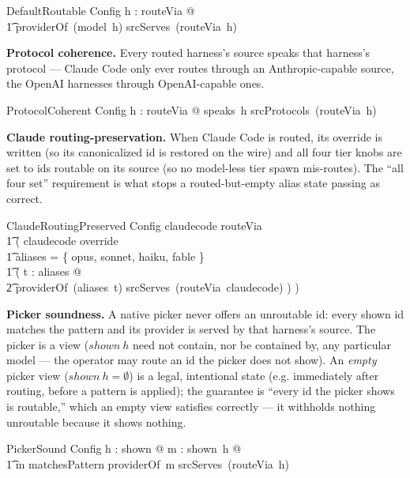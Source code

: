 \documentclass{article}
\begin{document}
\begin{schema}{DefaultRoutable}
	Config
	\where
	\forall h : \dom routeVia @ \\
	\t1 providerOf~(model~h) \in srcServes~(routeVia~h)
\end{schema}

\textbf{Protocol coherence.} Every routed harness's source speaks that harness's
protocol --- Claude Code only ever routes through an Anthropic-capable source,
the OpenAI harnesses through OpenAI-capable ones.

\begin{schema}{ProtocolCoherent}
	Config
	\where
	\forall h : \dom routeVia @ speaks~h \in srcProtocols~(routeVia~h)
\end{schema}

\textbf{Claude routing-preservation.} When Claude Code is routed, its override is
written (so its canonicalized id is restored on the wire) and all four tier
knobs are set to ids routable on its source (so no model-less tier spawn
mis-routes). The ``all four set'' requirement is what stops a routed-but-empty
alias state passing as correct.

\begin{schema}{ClaudeRoutingPreserved}
	Config
	\where
	claudecode \in \dom routeVia \implies \\
	\t1 ( claudecode \in override \land \\
	\t1   \dom aliases = \{ opus, sonnet, haiku, fable \} \land \\
	\t1   ( \forall t : \dom aliases @ \\
	\t2     providerOf~(aliases~t) \in srcServes~(routeVia~claudecode) ) )
\end{schema}

\textbf{Picker soundness.} A native picker never offers an unroutable id: every
shown id matches the pattern and its provider is served by that harness's
source. The picker is a view ($shown~h$ need not contain, nor be contained by,
any particular model --- the operator may route an id the picker does not show).
An \emph{empty} picker view ($shown~h = \emptyset$) is a legal, intentional state
(e.g. immediately after routing, before a pattern is applied); the guarantee is
``every id the picker shows is routable,'' which an empty view satisfies
correctly --- it withholds nothing unroutable because it shows nothing.

\begin{schema}{PickerSound}
	Config
	\where
	\forall h : \dom shown @ \forall m : shown~h @ \\
	\t1 m \in matchesPattern \land providerOf~m \in srcServes~(routeVia~h)
\end{schema}
\end{document}

